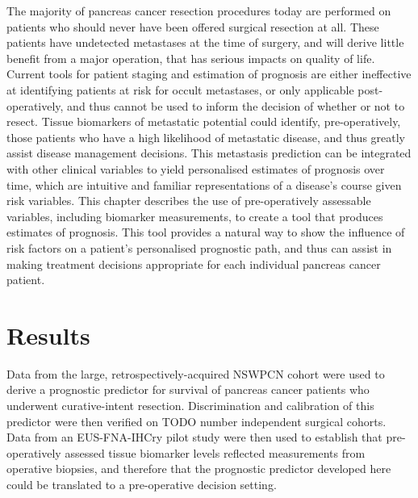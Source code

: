 \documentclass[dissertation.tex]{subfiles}
\begin{document}
The majority of pancreas cancer resection procedures today are performed on patients who should never have been offered surgical resection at all.  These patients have undetected metastases at the time of surgery, and will derive little benefit from a major operation, that has serious impacts on quality of life.  Current tools for patient staging and estimation of prognosis are either ineffective at identifying patients at risk for occult metastases, or only applicable post-operatively, and thus cannot be used to inform the decision of whether or not to resect.  Tissue biomarkers of metastatic potential could identify, pre-operatively, those patients who have a high likelihood of metastatic disease, and thus greatly assist disease management decisions.  This metastasis prediction can be integrated with other clinical variables to yield personalised estimates of prognosis over time, which are intuitive and familiar representations of a disease's course given risk variables.  This chapter describes the use of pre-operatively assessable variables, including biomarker measurements, to create a tool that produces estimates of prognosis.  This tool provides a natural way to show the influence of risk factors on a patient's personalised prognostic path, and thus can assist in making treatment decisions appropriate for each individual pancreas cancer patient.

\section{Results}
Data from the large, retrospectively-acquired \gls{NSWPCN} cohort were used to derive a prognostic predictor for survival of pancreas cancer patients who underwent curative-intent resection.  Discrimination and calibration of this predictor were then verified on TODO number independent surgical cohorts.  Data from an \gls{EUS}-\gls{FNA}-\acrshort{IHCry} pilot study were then used to establish that pre-operatively assessed tissue biomarker levels reflected measurements from operative biopsies, and therefore that the prognostic predictor developed here could be translated to a pre-operative decision setting.
\end{document}
